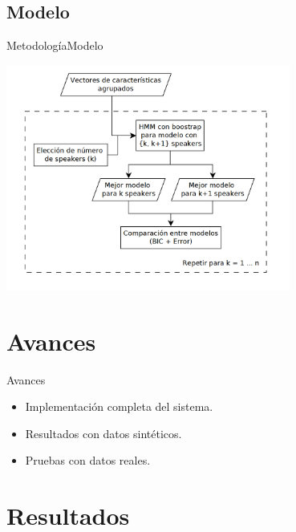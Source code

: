 \documentclass[10pt]{beamer}
\begin{document}
\subsection{Modelo}
\begin{frame}{Metodología}{Modelo}
  \begin{center}
    \includegraphics[width=0.7\textwidth]{gfx/dia-hmm}
  \end{center}
\end{frame}

\section{Avances}
\begin{frame}{Avances}
  \begin{itemize}
    \itemsep 3em
    \item Implementación completa del sistema.
    \item Resultados con datos sintéticos.
    \item Pruebas con datos reales.
  \end{itemize}
\end{frame}

\section{Resultados}
\end{document}
